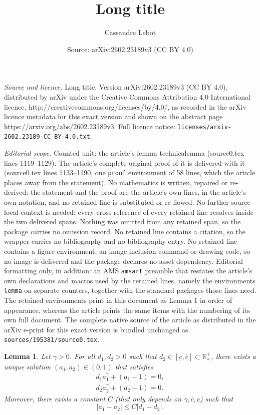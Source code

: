 \documentclass[10pt,a4paper]{amsart}
\title{Long title}
\author{Cassandre Lebot}
\date{Source: arXiv:2602.23189v3 (CC BY 4.0)}
\newtheorem{lemma}{Lemma}
\def\R{{\mathbb R}}%
\renewcommand{\leq}{\leqslant}\renewcommand{\le}{\leqslant}
\begin{document}
\maketitle

\noindent\emph{Source and licence.} Long title. Version arXiv:2602.23189v3 (CC BY 4.0), distributed by arXiv under the Creative Commons Attribution 4.0 International licence, http://creativecommons.org/licenses/by/4.0/, as recorded in the arXiv licence metadata for this exact version and shown on the abstract page https://arxiv.org/abs/2602.23189v3. Full licence notice: \texttt{licenses/arxiv-2602.23189-CC-BY-4.0.txt}.\par\smallskip

\noindent\textit{Editorial scope.} Counted unit: the article's lemma technicalemma (source0.tex lines 1119--1129). The article's complete original proof of it is delivered with it (source0.tex lines 1133--1190, one \texttt{proof} environment of 58 lines, which the article places away from the statement). No mathematics is written, repaired or re-derived: the statement and the proof are the article's own lines, in the article's own notation, and no retained line is substituted or re-flowed.  No further source-local context is needed: every cross-reference of every retained line resolves inside the two delivered spans.  Nothing was omitted from any retained span, so the package carries no omission record.  No retained line contains a citation, so the wrapper carries no bibliography and no bibliography entry.  No retained line contains a figure environment, an image-inclusion command or drawing code, so no image is delivered and the package declares no asset dependency.  Editorial formatting only, in addition: an AMS \texttt{amsart} preamble that restates the article's own declarations and macros used by the retained lines, namely the environments \texttt{lemma} on separate counters, together with the standard packages those lines need.  The retained environments print in this document as Lemma 1 in order of appearance, whereas the article prints the same items with the numbering of its own full document.  The complete native source of the article as distributed in the arXiv e-print for this exact version is bundled unchanged as \texttt{sources/195381/source0.tex}.
\begin{lemma}\label{technicalemma}
Let $\gamma >0$. For all $d_1, d_2 >0$ such that $d_2 \in [\underline{c},\overline{c}]\subset \R^+_*$, there exists a unique solution $(a_1,a_2) \in (0,1)$ that satisfies
\begin{align*}
 d_1 a_1^\gamma + (a_1-1) = 0,\\
 d_2 a_2^\gamma + (a_2-1) = 0.
\end{align*}
Moreover, there exists a constant $C$ (that only depends on $\gamma, \overline{c}, \underline{c}$) such that
\begin{equation*}
 \lvert a_1 - a_2 \rvert \leq C \lvert d_1 - d_2 \rvert.
\end{equation*}
\end{lemma}
\end{document}
